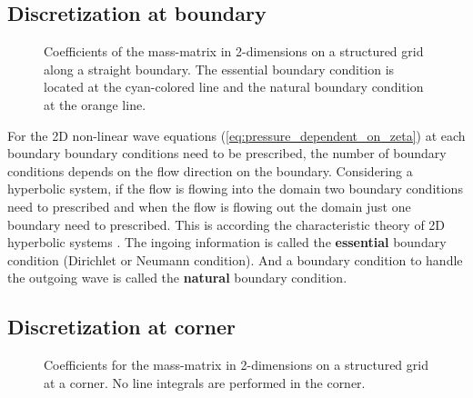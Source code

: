 \subsection{Discretization at boundary}
\begin{figure}[H]
    \begin{center}
        \def\svgwidth{0.80\textwidth} %
        \resizebox{0.65\textwidth}{!}{
            
        }
    \end{center}
    \caption[Definition of the grid to solve the 2D-shallow water equations at the boundary]{Coefficients of the mass-matrix in 2-dimensions on a structured grid along a straight boundary. The essential boundary condition is located at the cyan-colored line and the natural boundary condition at the orange line.}
    \label{fig:structured_grid_along_straight_boundary}
\end{figure}
For the 2D non-linear wave equations (\autoref{eq:pressure_dependent_on_zeta}) at each boundary boundary conditions need to be prescribed, the number of boundary conditions depends on the flow direction on the boundary.
Considering a hyperbolic system, if the flow is flowing into the domain two boundary conditions need to prescribed and when the flow is flowing out the domain just one boundary need to prescribed.
This is according the characteristic theory of 2D hyperbolic systems \citep{DaubertEtGraffe1967}.
The ingoing information is called the \textbf{essential} boundary condition (Dirichlet or Neumann condition).
And a boundary condition to handle the outgoing wave is called the \textbf{natural} boundary condition.
\subsection{Discretization at corner}
\begin{figure}[H]
    \begin{center}
        \def\svgwidth{0.8\textwidth} %
        \resizebox{0.65\textwidth}{!}{
            
        }
    \end{center}
    \caption{Coefficients for the mass-matrix in 2-dimensions on a structured grid at a corner. No line integrals are performed in the corner.}
    \label{fig:structured_grid_at_corner}
\end{figure}
